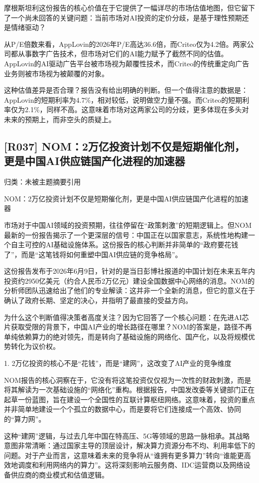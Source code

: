\documentclass[11pt]{ctexart}
\begin{document}
摩根斯坦利这份报告的核心价值在于它提供了一幅详尽的市场估值地图，但它留下了一个尚未回答的关键问题：当前市场对AI投资的定价分歧，是基于理性预期还是情绪驱动？

从P/E倍数来看，AppLovin的2026年P/E高达36.6倍，而Criteo仅为4.2倍。两家公司都从事数字广告技术，但市场对它们的AI能力赋予了截然不同的估值。AppLovin的AI驱动广告平台被市场视为颠覆性技术，而Criteo的传统重定向广告业务则被市场视为被颠覆的对象。

这种估值差异是否合理？报告没有给出明确的判断。但一个值得注意的数据是：AppLovin的短期利率为4.7\%，相对较低，说明做空力量不强。而Criteo的短期利率仅为2.1\%，同样不高。这意味着市场对这两家公司的分歧，更多体现在多头对未来的预期上，而非空头的质疑上。

\subsection{[R037] NOM：2万亿投资计划不仅是短期催化剂，更是中国AI供应链国产化进程的加速器}
{\small\color{refgray}归类：未被主题摘要引用}

NOM：2万亿投资计划不仅是短期催化剂，更是中国AI供应链国产化进程的加速器

市场对于中国AI领域的投资预期，往往停留在“政策刺激”的短期逻辑上。但NOM最新的一份报告揭示了一个更深层的信号：中国正在以国家意志，系统性地构建一个自主可控的AI基础设施体系。这份报告的核心判断并非简单的“政府要花钱了”，而是“这笔钱将如何重塑中国AI供应链的竞争格局”。

这份报告发布于2026年6月9日，针对的是当日彭博社报道的中国计划在未来五年内投资约2950亿美元（约合人民币2万亿元）建设全国数据中心网络的消息。NOM的分析师团队迅速给出了他们的专业解读：这并非一个全新的消息，但它的意义在于确认了政府长期、坚定的决心，并指明了最直接的受益方向。

为什么这个判断值得决策者高度关注？因为它回答了一个核心问题：在先进AI芯片获取受限的背景下，中国AI产业的增长路径在哪里？NOM的答案是，路径不再单纯依赖算力的绝对领先，而是转向了基础设施的网络化、国产化，以及将规模优势转化为议价权。

1. 2万亿投资的核心不是“花钱”，而是“建网”，这改变了AI产业的竞争维度

NOM报告的核心洞察在于，它没有将这笔投资仅仅视为一次性的财政刺激，而是将其解读为一次基础设施的“网络化”重构。根据报告，中国发改委等关键部门正在起草一份蓝图，旨在建设一个全国性的互联计算枢纽网络。这意味着，投资的重点并非简单地建设一个个孤立的数据中心，而是要将它们连接成一个高效、协同的“算力网”。

这种“建网”逻辑，与过去几年中国在特高压、5G等领域的思路一脉相承。其战略意图非常清晰：通过国家主导的顶层设计，解决算力资源分布不均、利用率低下的问题。对于产业而言，这意味着未来的竞争将从“谁拥有更多算力”转向“谁能更高效地调度和利用网络内的算力”。这将深刻影响云服务商、IDC运营商以及网络设备供应商的商业模式和估值逻辑。
\end{document}
